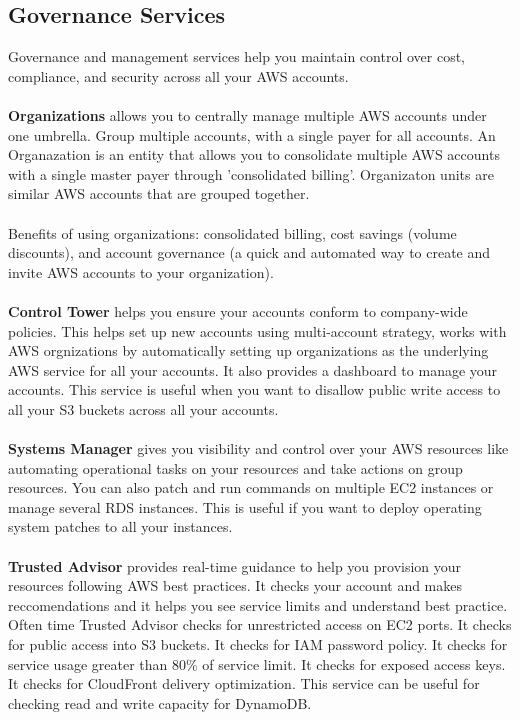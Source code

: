 \documentclass{article}%
\begin{document}
\subsection{Governance Services}
Governance and management services help you maintain control over cost, compliance, and security across all your AWS accounts. \\ \\ 
\textbf{Organizations} allows you to centrally manage multiple AWS accounts under one umbrella. Group multiple accounts, with a single payer for all accounts. An Organazation is an entity that allows you to consolidate multiple AWS accounts with a single master payer through 'consolidated billing'. Organizaton units are similar AWS accounts that are grouped together. \\ \\
Benefits of using organizations: consolidated billing, cost savings (volume discounts), and account governance (a quick and automated way to create and invite AWS accounts to your organization). \\ \\
\textbf{Control Tower} helps you ensure your accounts conform to company-wide policies. This helps set up new accounts using multi-account strategy, works with AWS orgnizations by automatically setting up organizations as the underlying AWS service for all your accounts. It also provides a dashboard to manage your accounts. This service is useful when you want to disallow public write access to all your S3 buckets across all your accounts.  \\ \\
\textbf{Systems Manager} gives you visibility and control over your AWS resources like automating operational tasks on your resources and take actions on group resources. You can also patch and run commands on multiple EC2 instances or manage several RDS instances. This is useful if you want to deploy operating system patches to all your instances. \\ \\
\textbf{Trusted Advisor} provides real-time guidance to help you provision your resources following AWS best practices. It checks your account and makes reccomendations and it helps you see service limits and understand best practice. Often time Trusted Advisor checks for unrestricted access on EC2 ports. It checks for public access into S3 buckets. It checks for IAM password policy. It checks for service usage greater than 80\% of service limit. It checks for exposed access keys. It checks for CloudFront delivery optimization. This service can be useful for checking read and write capacity for DynamoDB.
\end{document}
